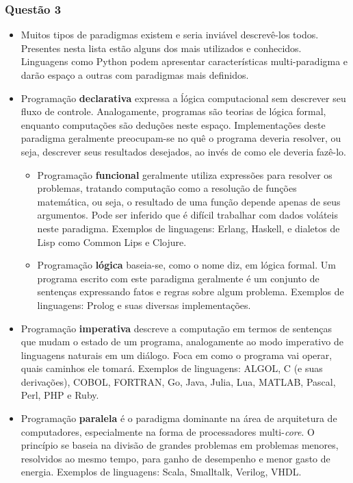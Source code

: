\documentclass{article}
\begin{document}
\subsubsection*{Questão 3}
\begin{itemize}
    \item Muitos tipos de paradigmas existem e seria inviável descrevê-los todos. Presentes nesta lista estão alguns dos mais utilizados e conhecidos. Linguagens como Python podem apresentar características multi-paradigma e darão espaço a outras com paradigmas mais definidos.
    
    \item Programação \textbf{declarativa} expressa a ĺógica computacional sem descrever seu fluxo de controle. Analogamente, programas são teorias de lógica formal, enquanto computações são deduções neste espaço. Implementações deste paradigma geralmente preocupam-se no quê o programa deveria resolver, ou seja, descrever seus resultados desejados, ao invés de como ele deveria fazê-lo.
    
    \begin{itemize}
        \item Programação \textbf{funcional} geralmente utiliza expressões para resolver os problemas, tratando computação como a resolução de funções matemática, ou seja, o resultado de uma função depende apenas de seus argumentos. Pode ser inferido que é difícil trabalhar com dados voláteis neste paradigma. Exemplos de linguagens: Erlang, Haskell, e dialetos de Lisp como Common Lips e Clojure.
        
        \item Programação \textbf{lógica} baseia-se, como o nome diz, em lógica formal. Um programa escrito com este paradigma geralmente é um conjunto de sentenças expressando fatos e regras sobre algum problema. Exemplos de linguagens: Prolog e suas diversas implementações.
    \end{itemize}
    
    \item Programação \textbf{imperativa} descreve a computação em termos de sentenças que mudam o estado de um programa, analogamente ao modo imperativo de linguagens naturais em um diálogo. Foca em como o programa vai operar, quais caminhos ele tomará. Exemplos de linguagens: ALGOL, C (e suas derivações), COBOL, FORTRAN, Go, Java, Julia, Lua, MATLAB, Pascal, Perl, PHP e Ruby.
    
    \item Programação \textbf{paralela} é o paradigma dominante na área de arquitetura de computadores, especialmente na forma de processadores multi-\textit{core}. O princípio se baseia na divisão de grandes problemas em problemas menores, resolvidos ao mesmo tempo, para ganho de desempenho e menor gasto de energia. Exemplos de linguagens: Scala, Smalltalk, Verilog, VHDL.
    

\end{itemize}
\end{document}
